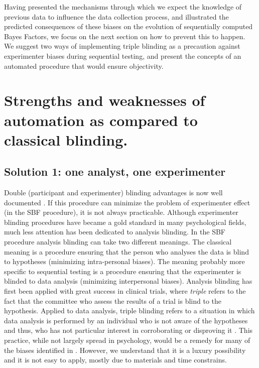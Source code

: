 \documentclass[a4paper,man,natbib,floatsintext,donotrepeattitle]{apa6}
\begin{document}
Having presented the mechanisms through which we expect the knowledge of previous data to influence the data collection process, and illustrated the predicted consequences of these biases on the evolution of sequentially computed Bayes Factors, we focus on the next section on how to prevent this to happen. We suggest two ways of implementing triple blinding as a precaution against experimenter biases during sequential testing, and present the concepts of an automated procedure that would ensure objectivity.

\section{Strengths and weaknesses of automation as compared to classical blinding.}

\subsection{Solution 1: one analyst, one experimenter}


Double (participant and experimenter) blinding advantages is now well documented \citep{schulz_blinding_2002}. If this procedure can minimize the problem of experimenter effect (in the SBF procedure), it is not always practicable. Although experimenter blinding procedures have became a gold standard in many psychological fields, much less attention has been dedicated to analysis blinding. In the SBF procedure analysis blinding can take two different meanings. The classical meaning is a procedure ensuring that the person who analyses the data is blind to hypotheses (minimizing intra-personal biases). The meaning probably more specific to sequential testing is a procedure ensuring that the experimenter is blinded to data analysis (minimizing interpersonal biases). Analysis blinding has first been applied with great success in clinical trials, where \textit{triple} refers to the fact that the committee who assess the results of a trial is blind to the hypothesis. Applied to data analysis, triple blinding refers to a situation in which data analysis is performed by an individual who is not aware of the hypotheses and thus, who has not particular interest in corroborating or disproving it \citep{miller_blind_2011}. This practice, while not largely spread in psychology, would be a remedy for many of the biases identified in \cite{wicherts_degrees_2016}. However, we understand that it is a luxury possibility and it is not easy to apply, mostly due to materials and time constrains.
\end{document}
